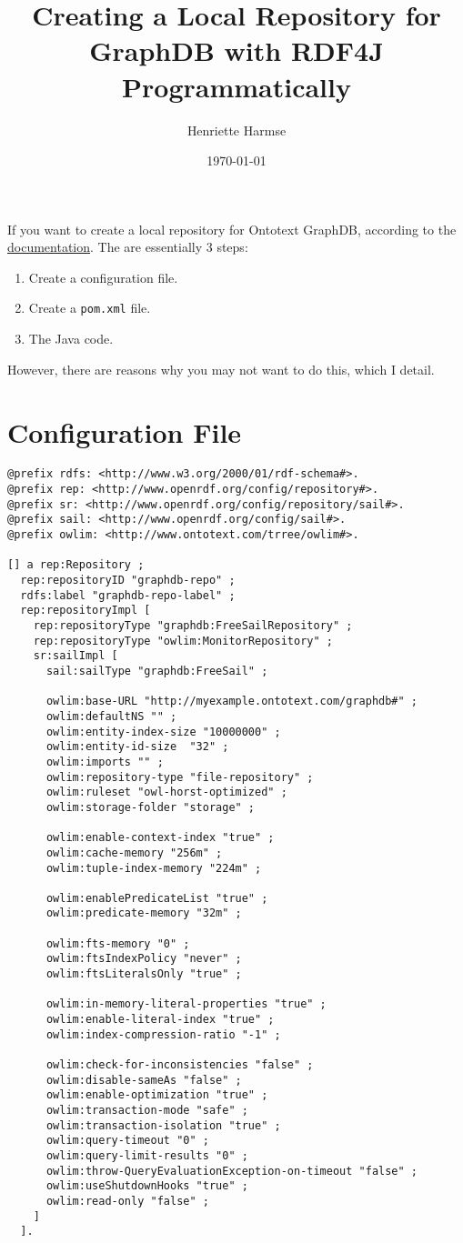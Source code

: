 \documentclass{amsart}
\title{Creating a Local Repository for GraphDB with RDF4J Programmatically}
\author{Henriette Harmse}
\date{\today}
\begin{document}
  \maketitle
  If you want to create a local repository for Ontotext GraphDB, according to the \href{http://graphdb.ontotext.com/documentation/enterprise/using-graphdb-with-the-rdf4j-api.html}{documentation}. The are essentially 3 steps:
  \begin{enumerate}
   \item Create a configuration file.
   \item Create a \texttt{pom.xml} file.
   \item The Java code.
  \end{enumerate}
  However, there are reasons why you may not want to do this, which I detail.
  

  \section{Configuration File}
  \begin{small}
  \begin{verbatim}
@prefix rdfs: <http://www.w3.org/2000/01/rdf-schema#>.
@prefix rep: <http://www.openrdf.org/config/repository#>.
@prefix sr: <http://www.openrdf.org/config/repository/sail#>.
@prefix sail: <http://www.openrdf.org/config/sail#>.
@prefix owlim: <http://www.ontotext.com/trree/owlim#>.

[] a rep:Repository ;
  rep:repositoryID "graphdb-repo" ;
  rdfs:label "graphdb-repo-label" ;
  rep:repositoryImpl [
    rep:repositoryType "graphdb:FreeSailRepository" ;
    rep:repositoryType "owlim:MonitorRepository" ;
    sr:sailImpl [
      sail:sailType "graphdb:FreeSail" ;
       
      owlim:base-URL "http://myexample.ontotext.com/graphdb#" ;
      owlim:defaultNS "" ;
      owlim:entity-index-size "10000000" ;
      owlim:entity-id-size  "32" ;
      owlim:imports "" ;
      owlim:repository-type "file-repository" ;
      owlim:ruleset "owl-horst-optimized" ;
      owlim:storage-folder "storage" ;
  
      owlim:enable-context-index "true" ;
      owlim:cache-memory "256m" ;
      owlim:tuple-index-memory "224m" ;

      owlim:enablePredicateList "true" ;
      owlim:predicate-memory "32m" ;

      owlim:fts-memory "0" ;
      owlim:ftsIndexPolicy "never" ;
      owlim:ftsLiteralsOnly "true" ;

      owlim:in-memory-literal-properties "true" ;
      owlim:enable-literal-index "true" ;
      owlim:index-compression-ratio "-1" ;
           
      owlim:check-for-inconsistencies "false" ;
      owlim:disable-sameAs "false" ;
      owlim:enable-optimization "true" ;
      owlim:transaction-mode "safe" ;
      owlim:transaction-isolation "true" ;
      owlim:query-timeout "0" ;
      owlim:query-limit-results "0" ;
      owlim:throw-QueryEvaluationException-on-timeout "false" ;
      owlim:useShutdownHooks "true" ;
      owlim:read-only "false" ;
    ]
  ].
  \end{verbatim}
  \end{small}
\end{document}
